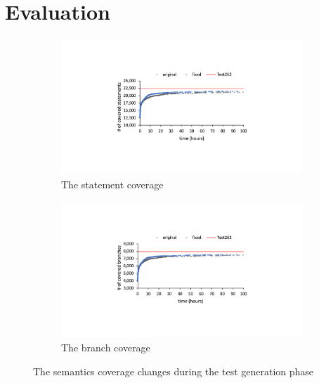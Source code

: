 \section{Evaluation}\label{sec:eval}

\begin{figure}[t]
  \centering
  \begin{subfigure}[t]{0.48\textwidth}
    \includegraphics[width=\textwidth]{img/stmt-coverage.pdf}
    \caption{The statement coverage}
    \label{fig:stmt-coverage}
  \end{subfigure}
  \quad
  \begin{subfigure}[t]{0.48\textwidth}
    \includegraphics[width=\textwidth]{img/branch-coverage.pdf}
    \caption{The branch coverage}
    \label{fig:branch-coverage}
  \end{subfigure}
  \caption{The semantics coverage changes during the test generation phase}
  \label{fig:sem-coverage}
  \vspace*{-1em}
\end{figure}

